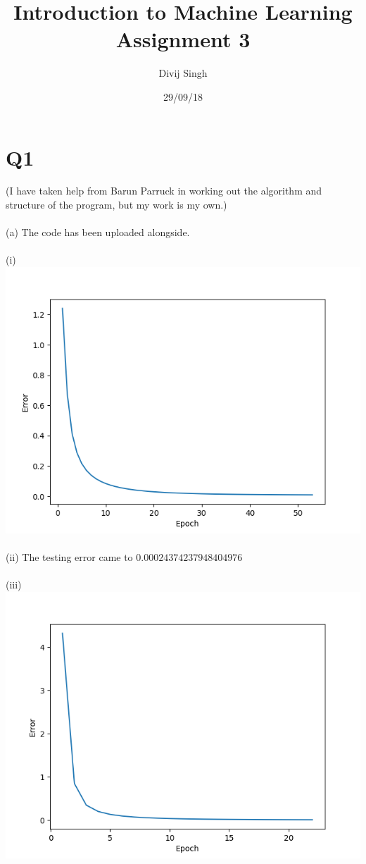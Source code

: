 \documentclass{article}
\title{Introduction to Machine Learning Assignment 3}
\author{Divij Singh}
\date{29/09/18}
\begin{document}
	\maketitle
	
	\section{Q1}
(I have taken help from Barun Parruck in working out the algorithm and structure of the program, but my work is my own.)\\
\\
(a) The code has been uploaded alongside.\\ \\
(i) \includegraphics[scale=0.5]{Figure_1.png}\\ \\
(ii) The testing error came to $0.00024374237948404976$ \\ \\
(iii)\includegraphics[scale=0.5]{Figure_2.png}\\ \\
\end{document}
